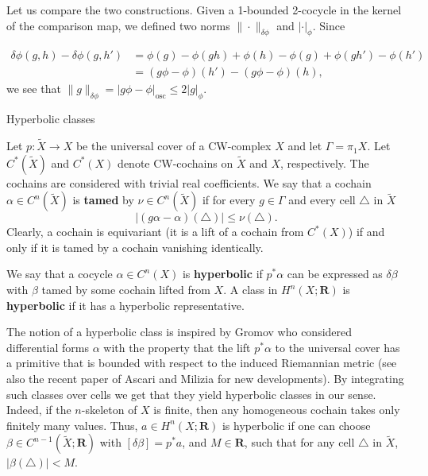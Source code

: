 \documentclass[12pt,reqno,a4paper]{amsart}
\makeatletter
\def\section{\@startsection{section}{1}%
  \z@{.7\linespacing\@plus\linespacing}{.5\linespacing}%
  {\normalfont\bfseries\raggedright\boldmath}}
\renewcommand{\emph}[1]{{\bfseries\boldmath #1}}
\theoremstyle{definition}
\theoremstyle{remark}
\numberwithin{equation}{section}
\numberwithin{figure}{section}
\newcommand{\B}[1]{{\mathbf #1}}
\newcommand{\R}{\mathrm}
\makeatother
\begin{document}
Let us compare the two constructions.  Given a 1-bounded 2-cocycle in the
kernel of the comparison map, we defined two norms $\|\cdot\|_{\delta\phi}$
and $|\cdot|_{\phi}$.  Since

\begin{align*}
\delta\phi(g,h)-\delta\phi(g,h')
&=\phi(g)-\phi(gh)+\phi(h)-\phi(g)+\phi(gh')-\phi(h')\\
&=(g\phi-\phi)(h')-(g\phi-\phi)(h),
\end{align*}
we see that $\|g\|_{\delta\phi}=|g\phi-\phi|_\R{osc}\leq2|g|_\phi$.



\section{Hyperbolic classes}\label{S:hyp classes}

Let $p\colon\widetilde X\to X$ be the universal cover of a CW-complex $X$ and let $\Gamma=\pi_1X$.
Let $C^*(\widetilde X)$ and $C^*(X)$ denote CW-cochains on $\widetilde X$ and $X$, respectively. 
The cochains are considered with trivial real coefficients.
We say
that a cochain $\alpha\in C^n(\widetilde X)$ is \emph{tamed} by $\nu\in C^n(\widetilde X)$  
if for every $g\in\Gamma$ and every cell $\triangle$ in $\widetilde X$
$$
|(g\alpha-\alpha)(\triangle)|\leq \nu(\triangle).
$$
Clearly, a cochain is equivariant (it is a lift of a cochain from $C^*(X)$)
if and only if it is tamed by a cochain vanishing identically.

We say that a cocycle $\alpha\in C^n(X)$ is \emph{hyperbolic} if $p^*\alpha$ can be expressed
as  $\delta\beta$ with $\beta$ tamed by some cochain lifted from $X$.
A class in $H^n(X;\B R)$ is \emph{hyperbolic} if it has a hyperbolic representative.

The notion of a hyperbolic class is inspired by Gromov \cite{zbMATH04186563}
who considered differential forms $\alpha$ with the property that the
lift $p^*\alpha$ to the universal cover has a primitive that is bounded with
respect to the induced Riemannian metric (see also the recent paper
of Ascari and Milizia \cite{zbMATH07862377} for new developments). 
By integrating such classes over
cells we get that they yield hyperbolic classes in our sense.
Indeed, if the $n$-skeleton of $X$ is finite, then any homogeneous cochain takes
only finitely many values. Thus, $a\in H^n(X;\B R)$ is hyperbolic if one can
choose $\beta\in C^{n-1}(\widetilde X;\B R)$ with $[\delta\beta]=p^*a$, and
$M\in\B R$, such that for any cell $\triangle$ in $\widetilde X$, $|\beta(\triangle)|<M$.
\end{document}
